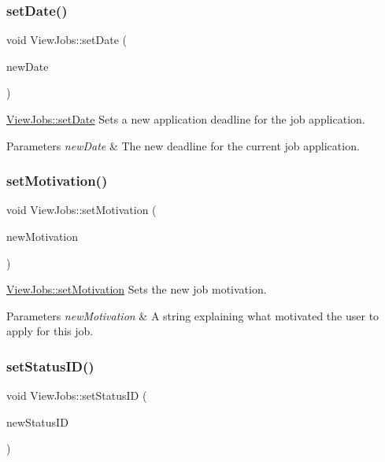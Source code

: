 \subsubsection{\texorpdfstring{set\+Date()}{setDate()}}
{\footnotesize\ttfamily void View\+Jobs\+::set\+Date (\begin{DoxyParamCaption}\item[{Q\+String}]{new\+Date }\end{DoxyParamCaption})}



\mbox{\hyperlink{class_view_jobs_a7574794410eb40956f343976de97221f}{View\+Jobs\+::set\+Date}} Sets a new application deadline for the job application. 


\begin{DoxyParams}{Parameters}
{\em new\+Date} & The new deadline for the current job application. \\
\hline
\end{DoxyParams}
\mbox{\label{class_view_jobs_a53bdfabaf2b442841d676f42ebbf975f}} 
\subsubsection{\texorpdfstring{set\+Motivation()}{setMotivation()}}
{\footnotesize\ttfamily void View\+Jobs\+::set\+Motivation (\begin{DoxyParamCaption}\item[{Q\+String}]{new\+Motivation }\end{DoxyParamCaption})}



\mbox{\hyperlink{class_view_jobs_a53bdfabaf2b442841d676f42ebbf975f}{View\+Jobs\+::set\+Motivation}} Sets the new job motivation. 


\begin{DoxyParams}{Parameters}
{\em new\+Motivation} & A string explaining what motivated the user to apply for this job. \\
\hline
\end{DoxyParams}
\mbox{\label{class_view_jobs_a55943415fd91377d5f701f7074ba58d6}} 
\subsubsection{\texorpdfstring{set\+Status\+I\+D()}{setStatusID()}}
{\footnotesize\ttfamily void View\+Jobs\+::set\+Status\+ID (\begin{DoxyParamCaption}\item[{int}]{new\+Status\+ID }\end{DoxyParamCaption})}



